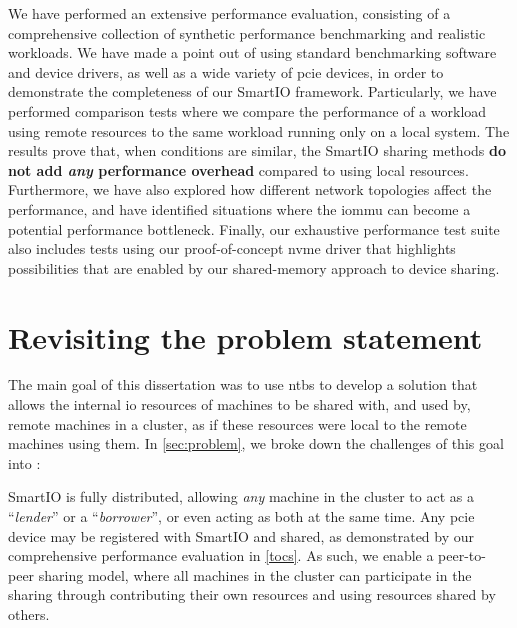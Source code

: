 We have performed an extensive performance evaluation, consisting of a comprehensive collection of synthetic performance benchmarking and realistic workloads.
%
We have made a point out of using standard benchmarking software and device drivers, as well as a wide variety of \gls{pcie} devices, in order to demonstrate the completeness of our SmartIO framework.
%
Particularly, we have performed comparison tests where we compare the performance of a workload using remote resources to the same workload running only on a local system.
%
The results prove that, when conditions are similar, the SmartIO sharing methods \textbf{do not add \emph{any} performance overhead} compared to using local resources.
%
Furthermore, we have also explored how different network topologies affect the performance, and have identified situations where the \gls{iommu} can become a potential performance bottleneck.
%
Finally, our exhaustive performance test suite also includes tests using our proof-of-concept \gls{nvme} driver that highlights possibilities that are enabled by our shared-memory approach to device sharing.






\section{Revisiting the problem statement}\label{sec:discussion}
The main goal of this dissertation was to use \glspl{ntb} to develop a solution that allows the internal \gls{io} resources of machines to be shared with, and used by, remote machines in a cluster, as if these resources were local to the remote machines using them.
%
In \cref{sec:problem}, we broke down the challenges of this goal into :






\objdistributed*%
%
%
%
SmartIO is fully distributed, allowing \emph{any} machine in the cluster to act as a ``\emph{\gls{lender}}'' or a ``\emph{\gls{borrower}}'', or even acting as both at the same time.
%
Any \gls{pcie} device may be registered with SmartIO and shared, as demonstrated by our comprehensive performance evaluation in \cref{tocs}.
%
As such, we enable a peer-to-peer sharing model, where all machines in the cluster can participate in the sharing through contributing their own resources and using resources shared by others.


